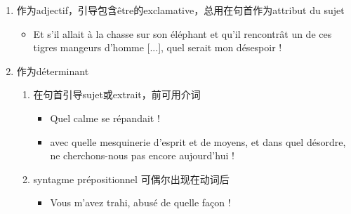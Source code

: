 \documentclass[UTF8]{report}
\begin{document}
\begin{enumerate}
    \item 作为adjectif，引导包含être的exclamative，总用在句首作为attribut du sujet
    \begin{itemize}
        \item Et s’il allait à la chasse sur son éléphant et qu’il rencontrât un de ces tigres mangeurs d’homme [...], quel serait mon désespoir !
    \end{itemize}
    \item 作为déterminant
    \begin{enumerate}
        \item 在句首引导sujet或extrait，前可用介词
        \begin{itemize}
            \item Quel calme se répandait !
            \item avec quelle mesquinerie d’esprit et de moyens, et dans quel désordre, ne cherchons-nous pas encore aujourd’hui !
        \end{itemize}
        \item syntagme prépositionnel 可偶尔出现在动词后
        \begin{itemize}
            \item Vous m’avez trahi, abusé de quelle façon ! 
        \end{itemize}
    \end{enumerate}
\end{enumerate}
\end{document}
